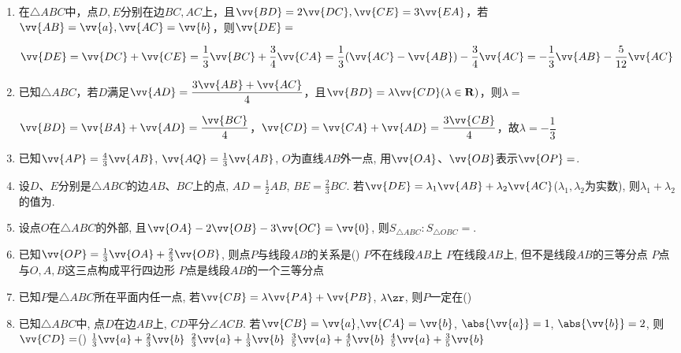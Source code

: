 \begin{enumerate}
    \item 在$\triangle{ABC}$中，点$D, E$分别在边$BC,AC$上，且$\vv{BD} = 2\vv{DC}, \vv{CE} = 3\vv{EA}$，若$\vv{AB} = \vv{a}, \vv{AC} = \vv{b}$，则$\vv{DE} = $
    \begin{jieda}
        $\vv{DE} = \vv{DC} + \vv{CE} = \dfrac{1}{3}\vv{BC} + \dfrac{3}{4}\vv{CA} = \dfrac{1}{3}(\vv{AC} - \vv{AB}) - \dfrac{3}{4}\vv{AC} = -\dfrac{1}{3}\vv{AB} - \dfrac{5}{12}\vv{AC}$
    \end{jieda}
    \item 已知$\triangle{ABC}$，若$D$满足$\vv{AD} = \dfrac{3\vv{AB} + \vv{AC}}{4}$，且$\vv{BD} = \lambda \vv{CD} (\lambda \in \mathbf{R})$，则$\lambda = $
    \begin{jieda}
        $\vv{BD} = \vv{BA} + \vv{AD} = \dfrac{\vv{BC}}{4}$，$\vv{CD} = \vv{CA} + \vv{AD} = \dfrac{3\vv{CB}}{4}$，故$\lambda = -\dfrac{1}{3}$
    \end{jieda}
    \item 已知$\vv{AP}=\frac{4}{3}\vv{AB}$, $\vv{AQ}=\frac{1}{3}\vv{AB}$, $O$为直线$AB$外一点, 用$\vv{OA}$、$\vv{OB}$表示$\vv{OP}=$. 
    \item 设$D$、$E$分别是$\triangle{ABC}$的边$AB$、$BC$上的点, $AD=\frac{1}{2}AB$, $BE=\frac{2}{3}BC$. 若$\vv{DE}=\lambda_1\vv{AB}+\lambda_2\vv{AC}$($\lambda_1,\lambda_2$为实数), 则$\lambda_1+\lambda_2$的值为. 
    \item 设点$O$在$\triangle{ABC}$的外部, 且$\vv{OA}-2\vv{OB}-3\vv{OC}=\vv{0}$, 则$S_{\triangle{ABC}}:S_{\triangle{OBC}}=$. 

    \item 已知$\vv{OP}=\frac{1}{3}\vv{OA}+\frac{2}{3}\vv{OB}$, 则点$P$与线段$AB$的关系是\dotfill()
    \xx
    {$P$不在线段$AB$上}
    {$P$在线段$AB$上, 但不是线段$AB$的三等分点}
    {$P$点与$O,A,B$这三点构成平行四边形}
    {$P$点是线段$AB$的一个三等分点}
    
    \item 已知$P$是$\triangle{ABC}$所在平面内任一点, 若$\vv{CB}=\lambda\vv{PA}+\vv{PB}$, $\lambda\zr$, 则$P$一定在\dotfill()

    \item 已知$\triangle{ABC}$中, 点$D$在边$AB$上, $CD$平分$\angle{ACB}$. 
    若$\vv{CB}=\vv{a}$,$\vv{CA}=\vv{b}$, $\abs{\vv{a}}=1$, $\abs{\vv{b}}=2$, 
    则$\vv{CD}=$\dotfill()
    \xx
    {$\frac{1}{3}\vv{a}+\frac{2}{3}\vv{b}$}
    {$\frac{2}{3}\vv{a}+\frac{1}{3}\vv{b}$}
    {$\frac{3}{5}\vv{a}+\frac{4}{5}\vv{b}$}
    {$\frac{4}{5}\vv{a}+\frac{3}{5}\vv{b}$}
    

\end{enumerate}
